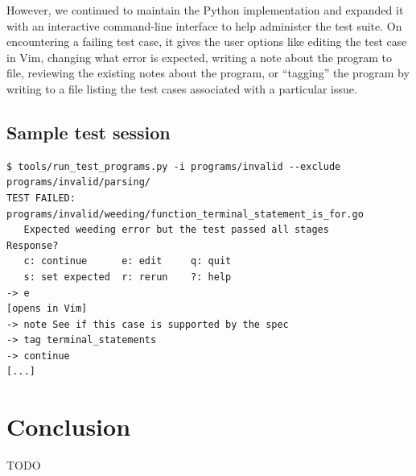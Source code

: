 \documentclass[oneside]{article}
\begin{document}
However, we continued to maintain the Python implementation and expanded it with an interactive command-line interface to help administer the test suite. On encountering a failing test case, it gives the user options like editing the test case in Vim, changing what error is expected, writing a note about the program to file, reviewing the existing notes about the program, or ``tagging'' the program by writing to a file listing the test cases associated with a particular issue.

\subsection{Sample test session}
\begin{verbatim}
$ tools/run_test_programs.py -i programs/invalid --exclude programs/invalid/parsing/
TEST FAILED: programs/invalid/weeding/function_terminal_statement_is_for.go
   Expected weeding error but the test passed all stages
Response?
   c: continue      e: edit     q: quit
   s: set expected  r: rerun    ?: help
-> e
[opens in Vim]
-> note See if this case is supported by the spec
-> tag terminal_statements
-> continue
[...]
\end{verbatim}

\section{Conclusion}
TODO
\end{document}
